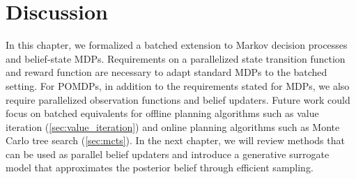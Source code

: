\section{Discussion}
In this chapter, we formalized a batched extension to Markov decision processes and belief-state MDPs.
Requirements on a parallelized state transition function and reward function are necessary to adapt standard MDPs to the batched setting.
For POMDPs, in addition to the requirements stated for MDPs, we also require parallelized observation functions and belief updaters.
Future work could focus on batched equivalents for offline planning algorithms such as value iteration (\cref{sec:value_iteration}) and online planning algorithms such as Monte Carlo tree search (\cref{sec:mcts}).
In the next chapter, we will review methods that can be used as parallel belief updaters and introduce a generative surrogate model that approximates the posterior belief through efficient sampling.
